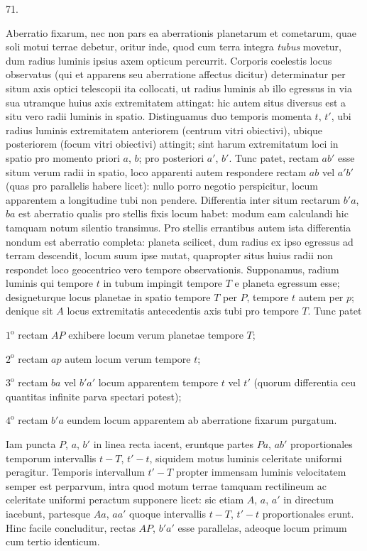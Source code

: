 \par{}\medskip
\hypertarget{native-091-article071}{}
\begin{center}71.\end{center}
Aberratio fixarum, nec non pars ea aberrationis planetarum et cometarum, quae soli motui terrae debetur, oritur inde, quod cum terra integra \emph{tubus} movetur, dum radius luminis ipsius axem opticum percurrit. Corporis coelestis locus observatus (qui et apparens seu aberratione affectus dicitur) determinatur per situm axis optici telescopii ita collocati, ut radius luminis ab illo egressus in via sua utramque huius axis extremitatem attingat: hic autem situs diversus est a situ vero radii luminis in spatio. Distinguamus duo temporis momenta $t$, $t'$, ubi radius luminis extremitatem anteriorem (centrum vitri obiectivi), ubique posteriorem (focum vitri obiectivi) attingit; sint harum extremitatum loci in spatio pro momento priori $a$, $b$; pro posteriori $a'$, $b'$. Tunc patet, rectam $ab'$ esse situm verum radii in spatio, loco apparenti autem respondere rectam $ab$ vel $a'b'$ (quas pro parallelis habere licet): nullo porro negotio perspicitur, locum apparentem a longitudine tubi non pendere. Differentia inter situm rectarum $b'a$, $ba$ est aberratio qualis pro stellis fixis locum habet: modum eam calculandi hic tamquam notum silentio transimus. Pro stellis errantibus autem ista differentia nondum est aberratio completa: planeta scilicet, dum radius ex ipso egressus ad terram descendit, locum suum ipse mutat, quapropter situs huius radii non respondet loco geocentrico vero tempore observationis. Supponamus, radium luminis qui tempore $t$ in tubum impingit tempore $T$ e planeta egressum esse; designeturque locus planetae in spatio tempore $T$ per $P$, tempore $t$ autem per $p$; denique sit $A$ locus extremitatis antecedentis axis tubi pro tempore $T$. Tunc patet
\par $1^{\mathrm{o}}$ rectam $AP$ exhibere locum verum planetae tempore $T$;
\par $2^{\mathrm{o}}$ rectam $ap$ autem locum verum tempore $t$;
\par $3^{\mathrm{o}}$ rectam $ba$ vel $b'a'$ locum apparentem tempore $t$ vel $t'$ (quorum differentia ceu quantitas infinite parva spectari potest);
\par $4^{\mathrm{o}}$ rectam $b'a$ eundem locum apparentem ab aberratione fixarum purgatum.

Iam puncta $P$, $a$, $b'$ in linea recta iacent, eruntque partes $Pa$, $ab'$ proportionales temporum intervallis $t-T$, $t'-t$, siquidem motus luminis celeritate uniformi peragitur. Temporis intervallum $t'-T$ propter immensam luminis velocitatem semper est perparvum, intra quod motum terrae tamquam rectilineum ac celeritate uniformi peractum supponere licet: sic etiam $A$, $a$, $a'$ in directum iacebunt, partesque $Aa$, $aa'$ quoque intervallis $t-T$, $t'-t$ proportionales erunt. Hinc facile concluditur, rectas $AP$, $b'a'$ esse parallelas, adeoque locum primum cum tertio identicum.

